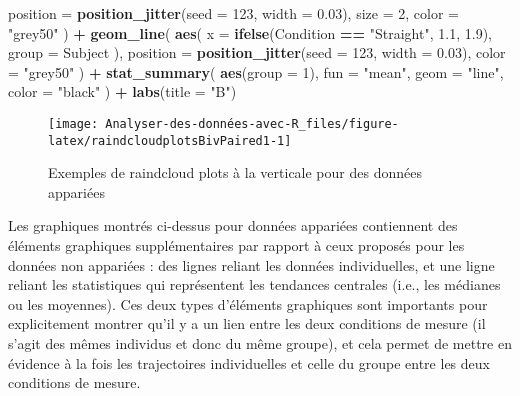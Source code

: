 \documentclass[
  french,
]{book}
\newenvironment{Shaded}{\begin{snugshade}}{\end{snugshade}}
\newcommand{\DataTypeTok}[1]{\textcolor[rgb]{0.13,0.29,0.53}{#1}}
\newcommand{\DecValTok}[1]{\textcolor[rgb]{0.00,0.00,0.81}{#1}}
\newcommand{\FloatTok}[1]{\textcolor[rgb]{0.00,0.00,0.81}{#1}}
\newcommand{\KeywordTok}[1]{\textcolor[rgb]{0.13,0.29,0.53}{\textbf{#1}}}
\newcommand{\NormalTok}[1]{#1}
\newcommand{\OperatorTok}[1]{\textcolor[rgb]{0.81,0.36,0.00}{\textbf{#1}}}
\newcommand{\StringTok}[1]{\textcolor[rgb]{0.31,0.60,0.02}{#1}}
\begin{document}
\begin{Shaded}
\begin{Highlighting}[]
    \DataTypeTok{position =} \KeywordTok{position_jitter}\NormalTok{(}\DataTypeTok{seed =} \DecValTok{123}\NormalTok{, }\DataTypeTok{width =} \FloatTok{0.03}\NormalTok{),}
    \DataTypeTok{size =} \DecValTok{2}\NormalTok{,}
    \DataTypeTok{color =} \StringTok{"grey50"}
\NormalTok{  ) }\OperatorTok{+}
\StringTok{  }\KeywordTok{geom_line}\NormalTok{(}
    \KeywordTok{aes}\NormalTok{(}
      \DataTypeTok{x =} \KeywordTok{ifelse}\NormalTok{(Condition }\OperatorTok{==}\StringTok{ "Straight"}\NormalTok{, }\FloatTok{1.1}\NormalTok{, }\FloatTok{1.9}\NormalTok{),}
      \DataTypeTok{group =}\NormalTok{ Subject}
\NormalTok{      ),}
    \DataTypeTok{position =} \KeywordTok{position_jitter}\NormalTok{(}\DataTypeTok{seed =} \DecValTok{123}\NormalTok{, }\DataTypeTok{width =} \FloatTok{0.03}\NormalTok{),}
    \DataTypeTok{color =} \StringTok{"grey50"}
\NormalTok{  ) }\OperatorTok{+}
\StringTok{  }\KeywordTok{stat_summary}\NormalTok{(}
    \KeywordTok{aes}\NormalTok{(}\DataTypeTok{group =} \DecValTok{1}\NormalTok{),}
    \DataTypeTok{fun =} \StringTok{"mean"}\NormalTok{,}
    \DataTypeTok{geom =} \StringTok{"line"}\NormalTok{,}
    \DataTypeTok{color =} \StringTok{"black"}
\NormalTok{  ) }\OperatorTok{+}
\StringTok{  }\KeywordTok{labs}\NormalTok{(}\DataTypeTok{title =} \StringTok{"B"}\NormalTok{)}
\end{Highlighting}
\end{Shaded}

\begin{figure}

{\centering \texttt{[image: Analyser-des-données-avec-R\_files/figure-latex/raindcloudplotsBivPaired1-1]} 

}

\caption{Exemples de raindcloud plots à la verticale pour des données appariées}\label{fig:raindcloudplotsBivPaired1}
\end{figure}

Les graphiques montrés ci-dessus pour données appariées contiennent des éléments graphiques supplémentaires par rapport à ceux proposés pour les données non appariées : des lignes reliant les données individuelles, et une ligne reliant les statistiques qui représentent les tendances centrales (i.e., les médianes ou les moyennes). Ces deux types d'éléments graphiques sont importants pour explicitement montrer qu'il y a un lien entre les deux conditions de mesure (il s'agit des mêmes individus et donc du même groupe), et cela permet de mettre en évidence à la fois les trajectoires individuelles et celle du groupe entre les deux conditions de mesure.
\end{document}
